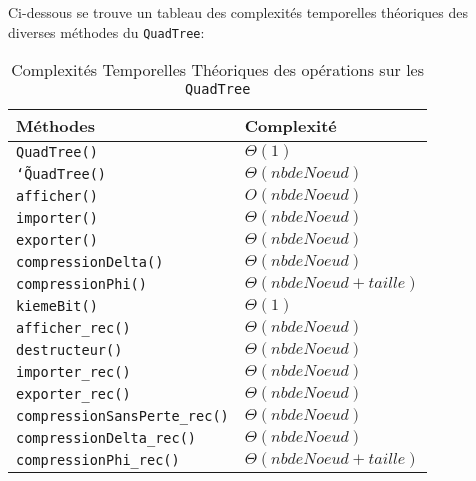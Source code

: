 \documentclass{article}
\newcommand{\info}{\texttt}
\newcommand{\qt}{\info{QuadTree}}
\begin{document}
        Ci-dessous se trouve un tableau des complexités temporelles théoriques des diverses méthodes du \qt :
        \begin{table}[H]
        	\centering
        	\label{ComplexiteTheo}
        	\begin{tabular}{|l|l|}
        		\hline
        		\rowcolor[HTML]{C0C0C0} 
        		{\color[HTML]{333333} \textbf{Méthodes}} & \textbf{Complexité} \\ \hline
        		\info{QuadTree()}                                 &  $\Theta(1)$                   \\ \hline
        		\info{\char`\~QuadTree()}                                &  $\Theta(nb de Noeud)$                   \\ \hline
        		\info{afficher()}                                &  $O(nb de Noeud)$                   \\ \hline
        		\info{importer()}                                 &  $\Theta(nb de Noeud)$                   \\ \hline
        		\info{exporter()}                               &  $\Theta(nb de Noeud)$                   \\ \hline
        		\info{compressionDelta()}                                &  $\Theta(nb de Noeud)$                   \\ \hline
        		\info{compressionPhi()}                                 &  $\Theta(nb de Noeud + taille)$                   \\ \hline
        		\info{kiemeBit()}                                 &  $\Theta(1)$                   \\ \hline
        		\info{afficher_rec()}                                 &  $\Theta(nb de Noeud)$                   \\ \hline
        		\info{destructeur()}                                 &  $\Theta(nb de Noeud)$                   \\ \hline
        		\info{importer_rec()}                                 &  $\Theta(nb de Noeud)$                   \\ \hline
        		\info{exporter_rec()}                                 &  $\Theta(nb de Noeud)$                   \\ \hline
        		\info{compressionSansPerte_rec()}                                 &  $\Theta(nb de Noeud)$                   \\ \hline
        		\info{compressionDelta_rec()}                                 &  $\Theta(nb de Noeud)$                   \\ \hline
        		\info{compressionPhi_rec()}                                 &  $\Theta(nb de Noeud + taille)$                   \\ \hline
        	\end{tabular}
        	\caption{Complexités Temporelles Théoriques des opérations sur les \qt}
        \end{table}
        
\end{document}
